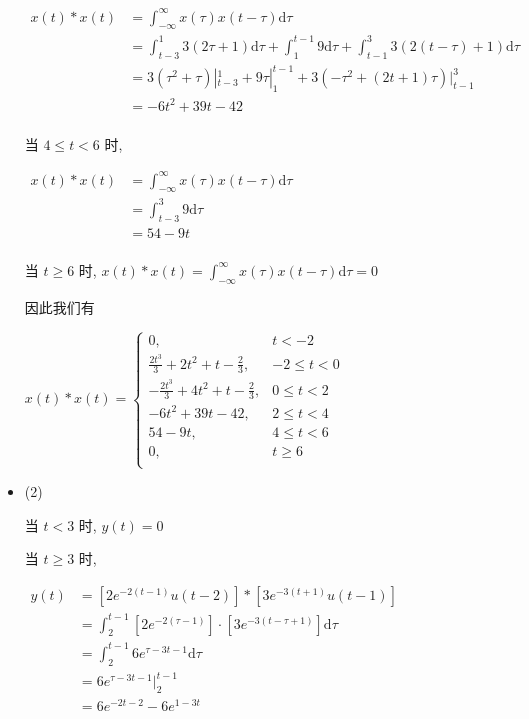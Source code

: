 \documentclass[a4paper,UTF8]{article}
\numberwithin{equation}{section}
\begin{document}
\begin{framed}
\begin{spacing}{1.5}
\begin{itemize}
      $
      \begin{aligned}
      x(t) * x(t) &= \int_{-\infty}^{\infty}x(\tau)x(t-\tau)\mathrm{d}\tau  \\
      &= \int_{t-3}^{1}3(2\tau+1)\mathrm{d}\tau + \int_{1}^{t-1}9\mathrm{d}\tau + \int_{t-1}^{3}3(2(t-\tau)+1)\mathrm{d}\tau  \\
      &= 3(\tau^{2}+\tau)|_{t-3}^{1} + 9\tau|_{1}^{t-1} + 3(-\tau^{2} + (2 t+1)\tau)|_{t-1}^{3}  \\
      &= - 6 t^{2} + 39 t - 42  \\
      \end{aligned}
      $
      
      当 $4 \le t < 6$ 时,
      
      $
      \begin{aligned}
      x(t) * x(t) &= \int_{-\infty}^{\infty}x(\tau)x(t-\tau)\mathrm{d}\tau  \\
      &= \int_{t-3}^{3}9\mathrm{d}\tau  \\
      &= 54 - 9 t  \\
      \end{aligned}
      $
      
      当 $t \ge 6$ 时, $\displaystyle x(t) * x(t) = \int_{-\infty}^{\infty}x(\tau)x(t-\tau)\mathrm{d}\tau = 0$
      
      因此我们有
      
      $x(t) * x(t) = \begin{cases}
          0, & t < -2 \\
          \frac{2 t^{3}}{3} + 2 t^{2} + t - \frac{2}{3}, & -2 \le t < 0  \\
          - \frac{2 t^{3}}{3} + 4 t^{2} + t - \frac{2}{3}, & 0 \le t < 2 \\
          - 6 t^{2} + 39 t - 42, & 2 \le t < 4 \\
          54 - 9 t, & 4 \le t < 6 \\
          0, & t \ge 6 \\
      \end{cases}$
      
      \item (2)
      
      当 $t < 3$ 时, $y(t) = 0$
      
      当 $t \ge 3$ 时,
      
      $
      \begin{aligned}
      y(t) &= [2e^{-2(t-1)}u(t-2)] * [3e^{-3(t+1)}u(t-1)] \\
      &= \int_{2}^{t-1}[2e^{-2(\tau-1)}]\cdot [3e^{-3(t-\tau+1)}]\mathrm{d}\tau \\
      &= \int_{2}^{t-1}6 e^{\tau - 3 t  - 1}\mathrm{d}\tau \\
      &= 6 e^{\tau - 3 t  - 1}|_{2}^{t-1} \\
      &= 6 e^{- 2 t - 2} - 6 e^{1 - 3 t} \\
      \end{aligned}
      $
      

\end{itemize}
\end{spacing}
\end{framed}
\end{document}
